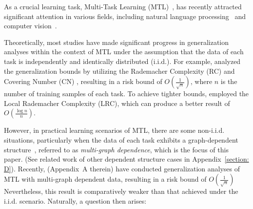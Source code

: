 \documentclass{article}
\begin{document}



As a crucial learning task, Multi-Task Learning (MTL)~\cite{caruana1997multitask,zhang2021survey}, has recently attracted significant attention in various fields, including natural language processing~\cite{liu2019multi,chen2024multi} and computer vision~\cite{wong2023fast}.

Theoretically, most studies have made significant progress in generalization analyses within the context of MTL under the assumption that the data of each task is independently and identically distributed (i.i.d.). For example, \cite{baxter95,maurer06linear,maurer2016benefit} analyzed the generalization bounds by utilizing the Rademacher Complexity (RC) \cite{rademacher02initial} and Covering Number (CN) \cite{covering02initial}, resulting in a risk bound of $O(\frac{1}{\sqrt{n}})$, where $n$ is the number of training samples of each task. To achieve tighter bounds, \cite{yousefi18,watkins2023optimistic} employed the Local Rademacher Complexity (LRC), which can produce a better result of $O(\frac{\log n}{n})$.

However, in practical learning scenarios of MTL, there are some non-i.i.d. situations, particularly when the data of each task exhibits a graph-dependent structure~\cite{wu2022mtgcn,21multiclass,wu2023macro-auc},
referred to as \emph{multi-graph dependence}, which is the focus of this paper. (See related work of other dependent structure cases in Appendix~\ref{section: D}). Recently, \cite{wu2023macro-auc} (Appendix~A therein) have conducted generalization analyses of MTL with multi-graph dependent data, resulting in a risk bound of $O(\frac{1}{\sqrt{n}})$
Nevertheless, this result is comparatively weaker than that achieved under the i.i.d. scenario. Naturally, a question then arises:
\end{document}
